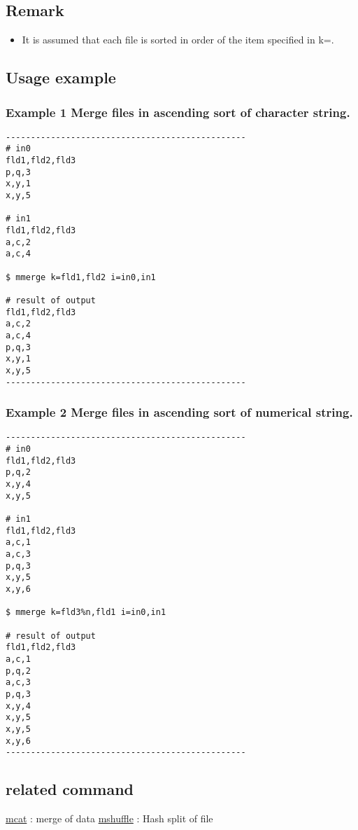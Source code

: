 \documentclass[a4paper]{jarticle}
\begin{document}
\subsection*{Remark}
\begin{itemize}
\item It is assumed that each file is sorted in order of the item specified in k=.
\end{itemize}

\subsection*{Usage example}
\subsubsection*{Example 1 Merge files in ascending sort of character string.}

\begin{verbatim}
------------------------------------------------
# in0
fld1,fld2,fld3
p,q,3
x,y,1
x,y,5

# in1
fld1,fld2,fld3
a,c,2
a,c,4

$ mmerge k=fld1,fld2 i=in0,in1

# result of output
fld1,fld2,fld3
a,c,2
a,c,4
p,q,3
x,y,1
x,y,5
------------------------------------------------
\end{verbatim}

\subsubsection*{Example 2 Merge files in ascending sort of numerical string.}

\begin{verbatim}
------------------------------------------------
# in0
fld1,fld2,fld3
p,q,2
x,y,4
x,y,5

# in1
fld1,fld2,fld3
a,c,1
a,c,3
p,q,3
x,y,5
x,y,6

$ mmerge k=fld3%n,fld1 i=in0,in1

# result of output
fld1,fld2,fld3
a,c,1
p,q,2
a,c,3
p,q,3
x,y,4
x,y,5
x,y,5
x,y,6
------------------------------------------------
\end{verbatim}

\subsection*{related command}

\hyperlink{mcat.pdf}{mcat} : merge of data
\hyperlink{mshuffle.pdf}{mshuffle} : Hash split of file
\end{document}

